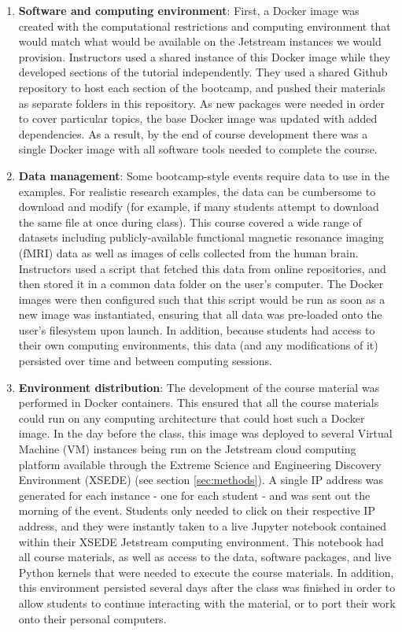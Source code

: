 \begin{enumerate}

\item {\bf Software and computing environment}: First, a Docker image
\cite{merkel2014docker} was created with the computational restrictions and
computing environment that would match what would be available on the Jetstream
instances we would provision. Instructors used a shared instance of this Docker
image while they developed sections of the tutorial independently. They used a
shared Github repository to host each section of the bootcamp, and pushed their
materials as separate folders in this repository. As new packages were needed in
order to cover particular topics, the base Docker image was updated with added
dependencies. As a result, by the end of course development there was a single
Docker image with all software tools needed to complete the course.

\item {\bf Data management}: Some bootcamp-style events require data to use in
the examples. For realistic research examples, the data can be cumbersome to
download and modify (for example, if many students attempt to download the
same file at once during class). This course covered a wide range of datasets
including publicly-available functional magnetic resonance imaging (fMRI) data
as well as images of cells collected from the human brain. Instructors used a
script that fetched this data from online repositories, and then stored it in
a common data folder on the user's computer. The Docker images were then
configured such that this script would be run as soon as a new image was
instantiated, ensuring that all data was pre-loaded onto the user's
filesystem upon launch. In addition, because students had access to their
own computing environments, this data (and any modifications of it) persisted
over time and between computing sessions.

\item {\bf Environment distribution}: The development of the course material was
performed in Docker containers. This ensured that all the course materials could
run on any computing architecture that could host such a Docker image. In the
day before the class, this image was deployed to several Virtual Machine (VM)
instances being run on the Jetstream cloud computing platform
\cite{Stewart2015Jetstream} available through the Extreme Science and
Engineering Discovery Environment (XSEDE) \cite{Towns2014XSEDE}  (see section
\ref{sec:methods}). A single IP address was generated for each instance - one
for each student - and was sent out the morning of the event. Students only
needed to click on their respective IP address, and they were instantly taken to
a live Jupyter notebook contained within their XSEDE Jetstream computing
environment. This notebook had all course materials, as well as access to the
data, software packages, and live Python kernels that were needed to execute the
course materials. In addition, this environment persisted several days after the
class was finished in order to allow students to continue interacting with the
material, or to port their work onto their personal computers.


\end{enumerate}
